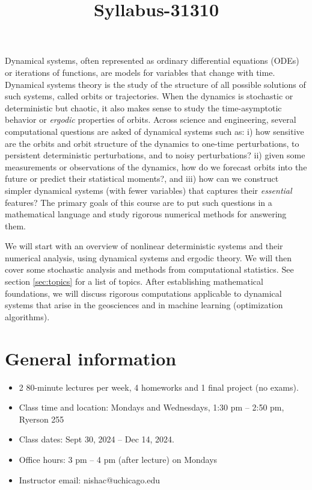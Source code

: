 \documentclass[12pt]{article}
\title{Syllabus-31310}
\begin{document}
\MakeScribeTop

Dynamical systems, often represented as ordinary differential equations (ODEs) or iterations of functions, are models for variables that change with time.
Dynamical systems theory is the study of the structure of all possible solutions of such systems, called orbits or trajectories. When the dynamics is stochastic or deterministic but chaotic, it also makes sense to study the time-asymptotic behavior or \emph{ergodic} properties of orbits. Across science and engineering, several computational questions are asked of dynamical systems such as: i) how sensitive are the orbits and orbit structure of the dynamics to one-time perturbations, to persistent deterministic perturbations, and to noisy perturbations?
ii) given some measurements or observations of the dynamics, how do we forecast orbits into the future or predict their statistical moments?, and iii) how can we construct simpler dynamical systems (with fewer variables) that captures their \emph{essential} features? The primary goals of this course are to put such questions in a mathematical language and study rigorous numerical methods for answering them.

We will start with an overview of nonlinear deterministic systems and their numerical analysis, using dynamical systems and ergodic theory. We will then cover some stochastic analysis and methods from computational statistics. See section \ref{sec:topics} for a list of topics. After establishing mathematical foundations, we will discuss rigorous computations applicable to dynamical systems that arise in the geosciences and in machine learning (optimization algorithms).

\section{General information}
\begin{itemize}
	\item 2 80-minute lectures per week, 4 homeworks and 1 final project (no exams).
	\item Class time and location: Mondays and Wednesdays, 1:30 pm -- 2:50 pm, Ryerson 255
	\item Class dates: Sept 30, 2024 -- Dec 14, 2024.
	\item Office hours: 3 pm -- 4 pm (after lecture) on Mondays
	\item Instructor email: nishac@uchicago.edu
\end{itemize}
\end{document}

